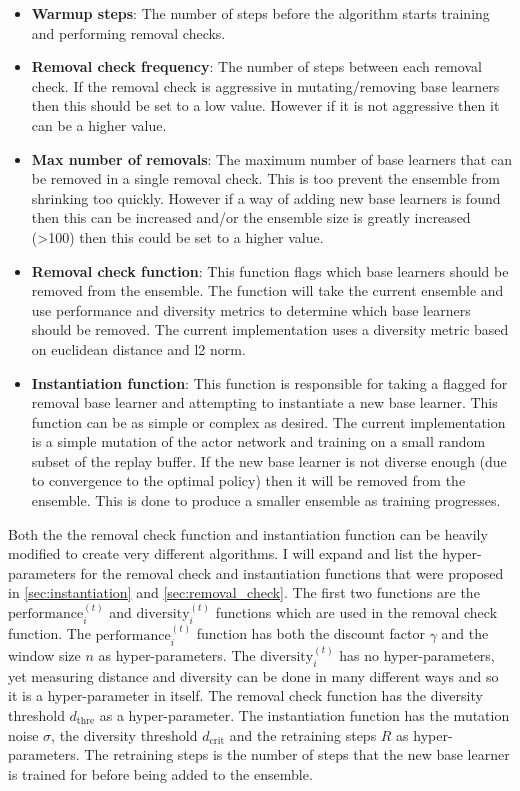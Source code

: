 \begin{itemize}
    \item \textbf{Warmup steps}: The number of steps before the algorithm starts training and performing removal checks.
    \item \textbf{Removal check frequency}: The number of steps between each removal check. If the removal check is aggressive in mutating/removing base learners then this should be set to a low value. However if it is not aggressive then it can be a higher value.
    \item \textbf{Max number of removals}: The maximum number of base learners that can be removed in a single removal check. This is too prevent the ensemble from shrinking too quickly. However if a way of adding new base learners is found then this can be increased and/or the ensemble size is greatly increased (>100) then this could be set to a higher value.
    \item \textbf{Removal check function}: This function flags which base learners should be removed from the ensemble. The function will take the current ensemble and use performance and diversity metrics to determine which base learners should be removed. The current implementation uses a diversity metric based on euclidean distance and l2 norm.
    \item \textbf{Instantiation function}: This function is responsible for taking a flagged for removal base learner and attempting to instantiate a new base learner. This function can be as simple or complex as desired. The current implementation is a simple mutation of the actor network and training on a small random subset of the replay buffer. If the new base learner is not diverse enough (due to convergence to the optimal policy) then it will be removed from the ensemble. This is done to produce a smaller ensemble as training progresses.
\end{itemize}

Both the the removal check function and instantiation function can be heavily modified to create very different algorithms. I will expand and list the hyper-parameters for the removal check and instantiation functions that were proposed in \ref{sec:instantiation} and \ref{sec:removal_check}. The first two functions are the $\text{performance}_i^{(t)}$ and $\text{diversity}_i^{(t)}$ functions which are used in the removal check function. The $\text{performance}_i^{(t)}$ function has both the discount factor $\gamma$ and the window size $n$ as hyper-parameters. The $\text{diversity}_i^{(t)}$ has no hyper-parameters, yet measuring distance and diversity can be done in many different ways and so it is a hyper-parameter in itself. The removal check function has the diversity threshold $d_{\text{thre}}$ as a hyper-parameter. The instantiation function has the mutation noise $\sigma$, the diversity threshold $d_{\text{crit}}$ and the retraining steps $R$ as hyper-parameters. The retraining steps is the number of steps that the new base learner is trained for before being added to the ensemble.

